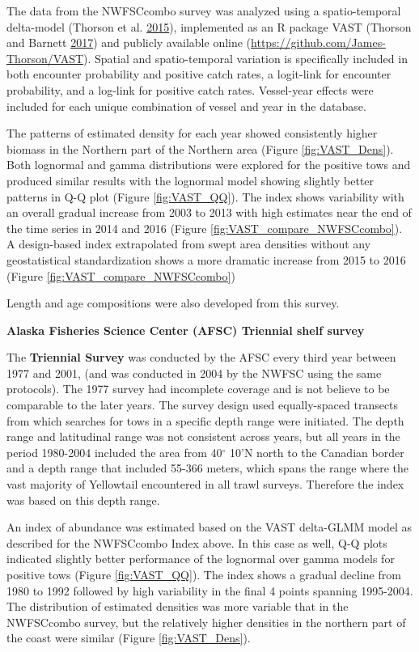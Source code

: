 \documentclass[12pt,]{article}
\begin{document}
The data from the NWFSCcombo survey was analyzed using a spatio-temporal
delta-model (Thorson et al. \protect\hyperlink{ref-Thorson2015}{2015}),
implemented as an R package VAST (Thorson and Barnett
\protect\hyperlink{ref-Thorson2017}{2017}) and publicly available online
(\url{https://github.com/James-Thorson/VAST}). Spatial and
spatio-temporal variation is specifically included in both encounter
probability and positive catch rates, a logit-link for encounter
probability, and a log-link for positive catch rates. Vessel-year
effects were included for each unique combination of vessel and year in
the database.

The patterns of estimated density for each year showed consistently
higher biomass in the Northern part of the Northern area (Figure
\ref{fig:VAST_Dens}). Both lognormal and gamma distributions were
explored for the positive tows and produced similar results with the
lognormal model showing slightly better patterns in Q-Q plot (Figure
\ref{fig:VAST_QQ}). The index shows variability with an overall gradual
increase from 2003 to 2013 with high estimates near the end of the time
series in 2014 and 2016 (Figure \ref{fig:VAST_compare_NWFSCcombo}). A
design-based index extrapolated from swept area densities without any
geostatistical standardization shows a more dramatic increase from 2015
to 2016 (Figure \ref{fig:VAST_compare_NWFSCcombo})

Length and age compositions were also developed from this survey.

\textbf{Alaska Fisheries Science Center (AFSC) Triennial shelf survey}

The \textbf{Triennial Survey} was conducted by the AFSC every third year
between 1977 and 2001, (and was conducted in 2004 by the NWFSC using the
same protocols). The 1977 survey had incomplete coverage and is not
believe to be comparable to the later years. The survey design used
equally-spaced transects from which searches for tows in a specific
depth range were initiated. The depth range and latitudinal range was
not consistent across years, but all years in the period 1980-2004
included the area from 40\(^\circ\) 10'N north to the Canadian border
and a depth range that included 55-366 meters, which spans the range
where the vast majority of Yellowtail encountered in all trawl surveys.
Therefore the index was based on this depth range.

An index of abundance was estimated based on the VAST delta-GLMM model
as described for the NWFSCcombo Index above. In this case as well, Q-Q
plots indicated slightly better performance of the lognormal over gamma
models for positive tows (Figure \ref{fig:VAST_QQ}). The index shows a
gradual decline from 1980 to 1992 followed by high variability in the
final 4 points spanning 1995-2004. The distribution of estimated
densities was more variable that in the NWFSCcombo survey, but the
relatively higher densities in the northern part of the coast were
similar (Figure \ref{fig:VAST_Dens}).
\end{document}

